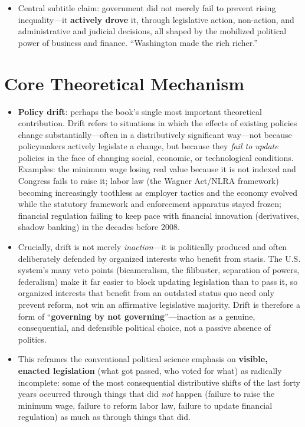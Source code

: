 \documentclass[12pt]{article}
\begin{document}
\begin{itemize}[leftmargin=*, itemsep=4pt]
    \item Central subtitle claim: government did not merely fail to prevent rising inequality---it \textbf{actively drove} it, through legislative action, non-action, and administrative and judicial decisions, all shaped by the mobilized political power of business and finance. ``Washington made the rich richer.''
\end{itemize}

\section{Core Theoretical Mechanism}

\begin{itemize}[leftmargin=*, itemsep=4pt]
    \item \textbf{Policy drift}: perhaps the book's single most important theoretical contribution. Drift refers to situations in which the effects of existing policies change substantially---often in a distributively significant way---not because policymakers actively legislate a change, but because they \emph{fail to update} policies in the face of changing social, economic, or technological conditions. Examples: the minimum wage losing real value because it is not indexed and Congress fails to raise it; labor law (the Wagner Act/NLRA framework) becoming increasingly toothless as employer tactics and the economy evolved while the statutory framework and enforcement apparatus stayed frozen; financial regulation failing to keep pace with financial innovation (derivatives, shadow banking) in the decades before 2008.
    \item Crucially, drift is not merely \emph{inaction}---it is politically produced and often deliberately defended by organized interests who benefit from stasis. The U.S. system's many veto points (bicameralism, the filibuster, separation of powers, federalism) make it far easier to block updating legislation than to pass it, so organized interests that benefit from an outdated status quo need only prevent reform, not win an affirmative legislative majority. Drift is therefore a form of ``\textbf{governing by not governing}''---inaction as a genuine, consequential, and defensible political choice, not a passive absence of politics.
    \item This reframes the conventional political science emphasis on \textbf{visible, enacted legislation} (what got passed, who voted for what) as radically incomplete: some of the most consequential distributive shifts of the last forty years occurred through things that did \emph{not} happen (failure to raise the minimum wage, failure to reform labor law, failure to update financial regulation) as much as through things that did.

\end{itemize}
\end{document}
